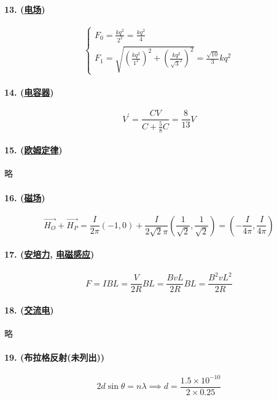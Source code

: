 \paragraph{13. (\hyperref[subsec:电场]{电场})}

\begin{equation*}
    \begin{cases}
        F_0=\frac{kq^2}{2^2}=\frac{kq^2}{4}\\
        F_1=\sqrt{\left(\frac{kq^2}{1^2}\right)^2+\left(\frac{kq^2}{\sqrt{3}^2}\right)^2}=\frac{\sqrt{10}}{3}kq^2
    \end{cases}
\end{equation*}

\paragraph{14. (\hyperref[subsec:电容器]{电容器})}

\begin{equation*}
    V^\prime=\frac{CV}{C+\frac58C}=\frac{8}{13}V
\end{equation*}

\paragraph{15. (\hyperref[subsec:欧姆定律]{欧姆定律})} 略

\paragraph{16. (\hyperref[subsec:磁场]{磁场})}

\begin{equation*}
    \vec{H_O}+\vec{H_P}=
    \frac{I}{2\pi}(-1,0)+\frac{I}{2\sqrt2\pi}\left(\frac{1}{\sqrt2},\frac{1}{\sqrt2}\right)=
    \left(-\frac{I}{4\pi},\frac{I}{4\pi}\right)
\end{equation*}

\paragraph{17. (\hyperref[subsec:安培力]{安培力}, \hyperref[subsec:电磁感应]{电磁感应})}

\begin{equation*}
    F=IBL=\frac{V}{2R}BL=\frac{BvL}{2R}BL=\frac{B^2vL^2}{2R}
\end{equation*}

\paragraph{18. (\hyperref[subsec:交流电]{交流电})} 略

\paragraph{19. (布拉格反射(未列出))}

\begin{equation*}
    2d\sin\theta=n\lambda\implies d=\frac{1.5\times10^{-10}}{2\times0.25}
\end{equation*}
